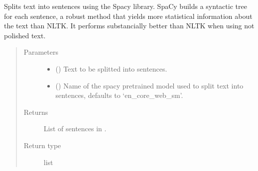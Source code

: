\documentclass[letterpaper,10pt,english]{sphinxmanual}
\begin{document}
\begin{fulllineitems}
\label{\detokenize{code:code_utils.utils.split_text_into_sentences_spacy}}
Splits text into sentences using the Spacy library. SpaCy builds a syntactic
tree for each sentence, a robust method that yields more statistical information
about the text than NLTK. It performs substancially better than NLTK when using 
not polished text.
\begin{quote}\begin{description}
\item[{Parameters}] \leavevmode\begin{itemize}
\item {} 
 () \textendash{} Text to be splitted into sentences.

\item {} 
 (\sphinxstyleliteralemphasis{\sphinxupquote{, }}) \textendash{} Name of the spacy pretrained model used to split text into
sentences, defaults to ‘en\_core\_web\_sm’.

\end{itemize}

\item[{Returns}] \leavevmode
List of sentences in .

\item[{Return type}] \leavevmode
list

\end{description}\end{quote}

\end{fulllineitems}

\end{document}
